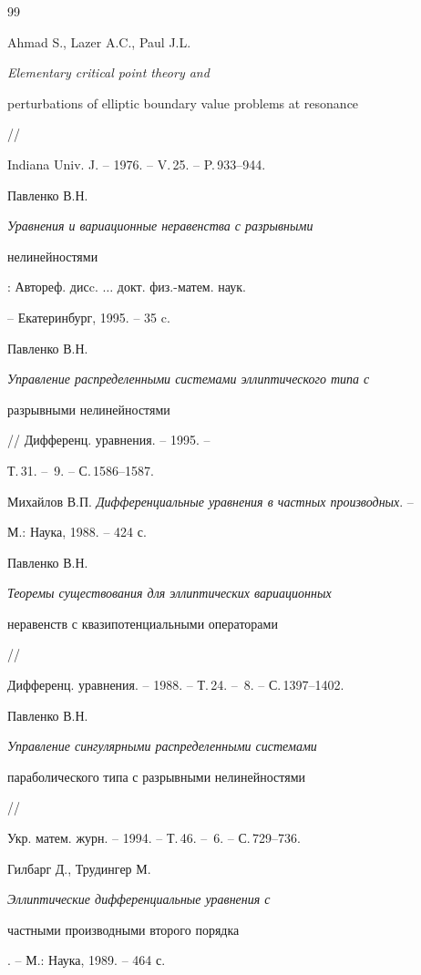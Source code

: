 \begin{thebibliography}{99}


Ahmad S., Lazer A.C., Paul J.L. {\em Elementary critical point theory and


perturbations of elliptic boundary value problems at resonance} // 


Indiana Univ. J. -- 1976. -- V.\,25. -- P.\,933--944.







Павленко В.Н. {\em Уравнения и вариационные неравенства с разрывными


нелинейностями}: Автореф. дисc. $\dotsc$ докт. физ.-матем. наук.


-- Екатеринбург, 1995. -- 35 c.







Павленко В.Н. {\em Управление распределенными системами эллиптического типа с


разрывными нелинейностями} // Дифференц. уравнения. -- 1995. -- 


Т.\,31. -- \No\,9. -- С.\,1586--1587.







Михайлов В.П. {\em Дифференциальные уравнения в частных производных}. -- 


М.: Наука, 1988. -- 424 с.







Павленко В.Н. {\em Теоремы существования для эллиптических вариационных


неравенств с квазипотенциальными операторами} // 


Дифференц. уравнения. -- 1988. -- Т.\,24. -- \No\,8. -- С.\,1397--1402.







Павленко В.Н. {\em Управление сингулярными распределенными системами


параболического типа с разрывными нелинейностями} // 


Укр. матем. журн. -- 1994. -- Т.\,46. -- \No\,6. -- С.\,729--736.







Гилбарг Д., Трудингер М. {\em Эллиптические дифференциальные уравнения с


частными производными второго порядка}. -- М.: Наука, 1989. -- 464 с.





\end{thebibliography}





